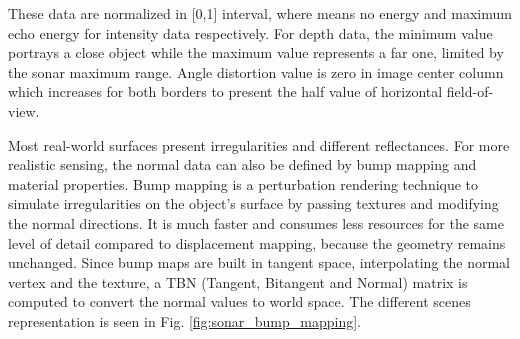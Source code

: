 \documentclass[final,5p,times]{elsarticle}
\begin{document}
These data are normalized in [0,1] interval, where means no energy and maximum echo energy for intensity data respectively. For depth data, the minimum value portrays a close object while the maximum value represents a far one, limited by the sonar maximum range. Angle distortion value is zero in image center column which increases for both borders to present the half value of horizontal field-of-view.

Most real-world surfaces present irregularities and different reflectances. For more realistic sensing, the normal data can also be defined by bump mapping and material properties. Bump mapping is a perturbation rendering technique to simulate irregularities on the object's surface by passing textures and modifying the normal directions. It is much faster and consumes less resources for the same level of detail compared to displacement mapping, because the geometry remains unchanged. Since bump maps are built in tangent space, interpolating the normal vertex and the texture, a TBN (Tangent, Bitangent and Normal) matrix is computed to convert the normal values to world space. The different scenes representation is seen in Fig. \ref{fig:sonar_bump_mapping}.
\end{document}
